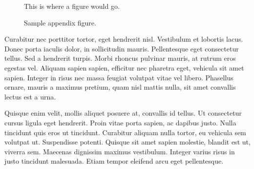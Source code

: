 \documentclass{brandeis-thesis3.2}
\begin{document}
\begin{figure}[t]
    \centering
    This is where a figure would go.
    \caption{Sample appendix figure.}
    \label{fig:sampleappendix}
\end{figure}

Curabitur nec porttitor tortor, eget hendrerit nisl. Vestibulum et lobortis lacus. Donec porta iaculis dolor, in sollicitudin mauris. Pellentesque eget consectetur tellus. Sed a hendrerit turpis. Morbi rhoncus pulvinar mauris, at rutrum eros egestas vel. Aliquam sapien sapien, efficitur nec pharetra eget, vehicula sit amet sapien. Integer in risus nec massa feugiat volutpat vitae vel libero. Phasellus ornare, mauris a maximus pretium, quam nisl mattis nulla, sit amet convallis lectus est a urna.

Quisque enim velit, mollis aliquet posuere at, convallis id tellus. Ut consectetur cursus ligula eget hendrerit. Proin vitae porta sapien, ac dapibus justo. Nulla tincidunt quis eros ut tincidunt. Curabitur aliquam nulla tortor, eu vehicula sem volutpat ut. Suspendisse potenti. Quisque sit amet sapien molestie, blandit est ut, viverra sem. Maecenas dignissim maximus vestibulum. Integer varius risus in justo tincidunt malesuada. Etiam tempor eleifend arcu eget pellentesque.
\end{document}

